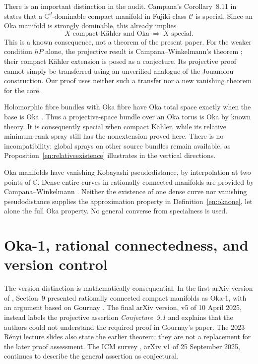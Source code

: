 \documentclass[12pt]{amsart}
\theoremstyle{definition}
\theoremstyle{remark}
\numberwithin{equation}{section}
\newcommand{\C}{\mathbb{C}}
\begin{document}
There is an important distinction in the audit. Campana's Corollary~8.11 in \cite{en:Campana} states that a $\C^d$-dominable compact manifold in Fujiki class $\mathcal C$ is special. Since an Oka manifold is strongly dominable, this already implies
\[
X\text{ compact K\"ahler and Oka}\ \Longrightarrow\ X\text{ special}.
\]
This is a known consequence, not a theorem of the present paper. For the weaker condition $hP$ alone, the projective result is Campana--Winkelmann's theorem \cite{en:CWhP}; their compact K\"ahler extension is posed as a conjecture. Its projective proof cannot simply be transferred using an unverified analogue of the Jouanolou construction. Our proof uses neither such a transfer nor a new vanishing theorem for the core.

Holomorphic fibre bundles with Oka fibre have Oka total space exactly when the base is Oka \cite{en:Book}. Thus a projective-space bundle over an Oka torus is Oka by known theory. It is consequently special when compact K\"ahler, while its relative minimum-rank spray still has the nonextension proved here. There is no incompatibility: global sprays on other source bundles remain available, as Proposition~\ref{en:relativeexistence} illustrates in the vertical directions.

Oka manifolds have vanishing Kobayashi pseudodistance, by interpolation at two points of $\C$. Dense entire curves in rationally connected manifolds are provided by Campana--Winkelmann \cite{en:CWdense}. Neither the existence of one dense curve nor vanishing pseudodistance supplies the approximation property in Definition~\ref{en:okaone}, let alone the full Oka property. No general converse from specialness is used.

\section{Oka-1, rational connectedness, and version control}\label{en:versions}
The version distinction is mathematically consequential. In the first arXiv version of \cite{en:AF}, Section~9 presented rationally connected compact manifolds as Oka-1, with an argument based on Gournay \cite{en:Gournay}. The final arXiv version, v5 of 10 April 2025, instead labels the projective assertion \emph{Conjecture~9.1} and explains that the authors could not understand the required proof in Gournay's paper. The 2023 R\'enyi lecture slides \cite{en:Slides} also state the earlier theorem; they are not a replacement for the later proof assessment. The ICM survey \cite{en:ICM}, arXiv v1 of 25 September 2025, continues to describe the general assertion as conjectural.
\end{document}
